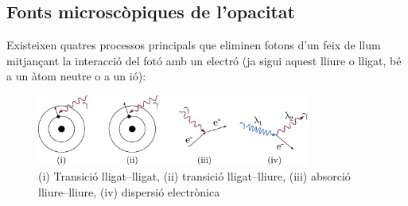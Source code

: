 \subsection{Fonts microscòpiques de l'opacitat}
Existeixen quatres processos principals que eliminen fotons d'un feix de llum mitjançant la interacció del fotó amb un electró (ja sigui aquest lliure o lligat, bé a un àtom neutre o a un ió):
\begin{figure}[h]
	\centering
	\includegraphics[width=0.8\textwidth]{./images/4-fonts-opacitat}
	\caption{(i) Transició lligat--lligat, (ii) transició lligat--lliure, (iii) absorció lliure--lliure, (iv) dispersió electrònica}
	\label{fig:fonts-opacitat}
\end{figure}


